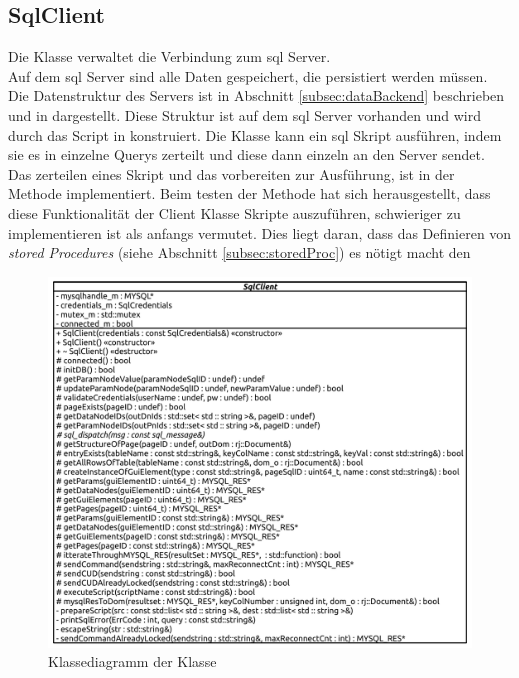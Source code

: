 \subsection{SqlClient}
Die  Klasse verwaltet die Verbindung zum \ac{sql} Server. \\Auf dem \ac{sql} Server sind alle Daten gespeichert, die persistiert werden müssen. 
Die Datenstruktur des Servers ist in Abschnitt \ref{subsec:dataBackend} beschrieben und in  dargestellt.
Diese Struktur ist auf dem \ac{sql} Server vorhanden und wird durch das Script in  konstruiert.
Die  Klasse kann ein \ac{sql} Skript ausführen, indem sie es in einzelne Querys zerteilt und diese dann einzeln an den Server sendet.
Das zerteilen eines Skript und das vorbereiten zur Ausführung, ist in der Methode  implementiert. 
Beim testen der Methode hat sich herausgestellt, dass diese Funktionalität der  Client Klasse Skripte auszuführen, schwieriger zu implementieren ist als anfangs vermutet.
Dies liegt daran, dass das Definieren von \emph{stored Procedures} (siehe Abschnitt \ref{subsec:storedProc}) es nötigt macht den 
\begin{figure}[ht]
  \centering
  \includegraphics[width=\textwidth]{content/hauptteil/umsetzungPoC/backend/uml/classesOfOverview/SqlClient.pdf}
  \caption{Klassediagramm der Klasse }
  \label{fig:backend:classDiag:SqlClient}
\end{figure}
